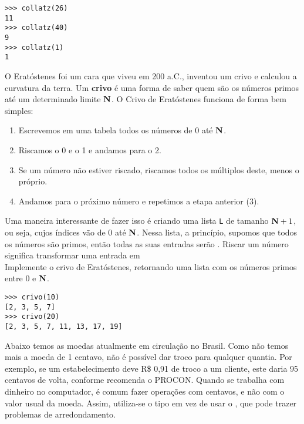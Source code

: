 \documentclass[12pt]{article}
\begin{document}
	\example
	\begin{lstlisting}
>>> collatz(26)
11
>>> collatz(40)
9
>>> collatz(1)
1
	\end{lstlisting}
	
	\pagebreak
	
	
	O Eratóstenes foi um cara que viveu em 200 a.C., inventou um crivo e calculou a curvatura da terra.
	Um \textbf{crivo} é uma forma de saber quem são os números primos até um determinado limite $\mathbf{N}$. O Crivo de Eratóstenes funciona de forma bem simples:
	
	\begin{enumerate}
		\item Escrevemos em uma tabela todos os números de 0 até $\mathbf{N}$.

		\item Riscamos o 0 e o 1 e andamos para o 2.

		\item Se um número não estiver riscado, riscamos todos os múltiplos deste, menos o próprio.
		
		\item Andamos para o próximo número e repetimos a etapa anterior (3).		
	\end{enumerate}
	
	Uma maneira interessante de fazer isso é criando uma lista \texttt{L} de tamanho $\mathbf{N} + 1$, ou seja, cujos índices vão de 0 até $\mathbf{N}$. Nessa lista, a princípio, supomos que todos os números são primos, então todas as suas entradas serão . Riscar um número significa transformar uma entrada em \\
	
	\quest Implemente o crivo de Eratóstenes, retornando uma lista com os números primos entre 0 e $\mathbf{N}$.\\
	
	\example
	\begin{lstlisting}
>>> crivo(10)
[2, 3, 5, 7]
>>> crivo(20)
[2, 3, 5, 7, 11, 13, 17, 19]
	\end{lstlisting}
	
	\pagebreak
	
	
	Abaixo temos as moedas atualmente em circulação no Brasil. Como não temos mais a moeda de 1 centavo, não é possível dar troco para qualquer quantia. Por exemplo, se um estabelecimento deve R\$ 0,91 de troco a um cliente, este daria 95 centavos de volta, conforme recomenda o PROCON.
	Quando se trabalha com dinheiro no computador, é comum fazer operações com centavos, e não com o valor usual da moeda. Assim, utiliza-se o tipo  em vez de usar o , que pode trazer problemas de arredondamento.\\
	
\end{document}
